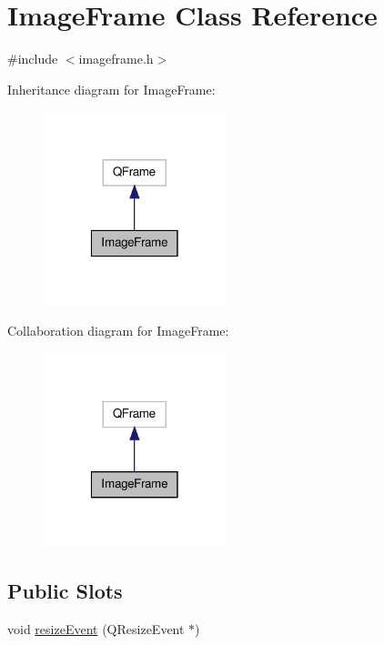 \hypertarget{classImageFrame}{\section{Image\-Frame Class Reference}
\label{classImageFrame}
}


{\ttfamily \#include $<$imageframe.\-h$>$}



Inheritance diagram for Image\-Frame\-:
\nopagebreak
\begin{figure}[H]
\begin{center}
\leavevmode
\includegraphics[width=150pt]{classImageFrame__inherit__graph}
\end{center}
\end{figure}


Collaboration diagram for Image\-Frame\-:
\nopagebreak
\begin{figure}[H]
\begin{center}
\leavevmode
\includegraphics[width=150pt]{classImageFrame__coll__graph}
\end{center}
\end{figure}
\subsection*{Public Slots}
\begin{DoxyCompactItemize}
\item 
void \hyperlink{classImageFrame_a03c4a3c033846294a43a2a87eb0b5f30}{resize\-Event} (Q\-Resize\-Event $\ast$)
\end{DoxyCompactItemize}
